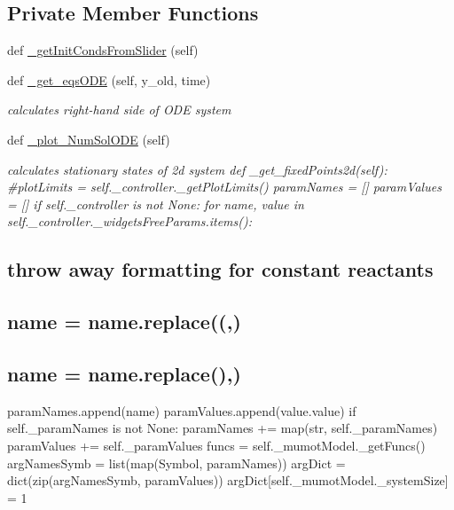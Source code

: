 \subsection*{Private Member Functions}
\begin{DoxyCompactItemize}
\item 
def \hyperlink{class_mu_mo_t_1_1_mu_mo_t_1_1_mu_mo_ttime_evolution_view_ae0c30bb947416bd557c983fe668513a8}{\+\_\+get\+Init\+Conds\+From\+Slider} (self)
\item 
def \hyperlink{class_mu_mo_t_1_1_mu_mo_t_1_1_mu_mo_ttime_evolution_view_ac73bb501e7bfd03ba030d3ec04688232}{\+\_\+get\+\_\+eqs\+O\+DE} (self, y\+\_\+old, time)
\begin{DoxyCompactList}\small\item\em calculates right-\/hand side of O\+DE system \end{DoxyCompactList}\item 
def \hyperlink{class_mu_mo_t_1_1_mu_mo_t_1_1_mu_mo_ttime_evolution_view_a588142f52d59a2abf3229d40beffbe7e}{\+\_\+plot\+\_\+\+Num\+Sol\+O\+DE} (self)
\begin{DoxyCompactList}\small\item\em calculates stationary states of 2d system def \+\_\+get\+\_\+fixed\+Points2d(self)\+: \#plot\+Limits = self.\+\_\+controller.\+\_\+get\+Plot\+Limits() param\+Names = \mbox{[}\mbox{]} param\+Values = \mbox{[}\mbox{]} if self.\+\_\+controller is not None\+: for name, value in self.\+\_\+controller.\+\_\+widgets\+Free\+Params.\+items()\+: \subsection*{throw away formatting for constant reactants}

\subsection*{name = name.\+replace(\textquotesingle{}(\textquotesingle{},\textquotesingle{}\textquotesingle{})}

\subsection*{name = name.\+replace(\textquotesingle{})\textquotesingle{},\textquotesingle{}\textquotesingle{})}

param\+Names.\+append(name) param\+Values.\+append(value.\+value) if self.\+\_\+param\+Names is not None\+: param\+Names += map(str, self.\+\_\+param\+Names) param\+Values += self.\+\_\+param\+Values funcs = self.\+\_\+mumot\+Model.\+\_\+get\+Funcs() arg\+Names\+Symb = list(map(\+Symbol, param\+Names)) arg\+Dict = dict(zip(arg\+Names\+Symb, param\+Values)) arg\+Dict\mbox{[}self.\+\_\+mumot\+Model.\+\_\+system\+Size\mbox{]} = 1 \end{DoxyCompactList}\end{DoxyCompactItemize}

